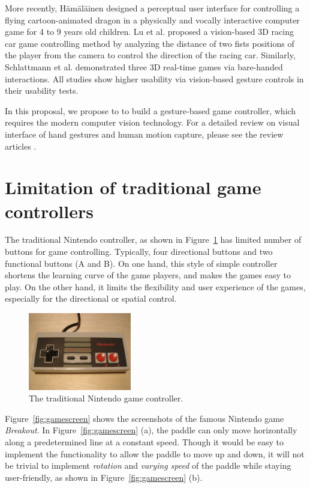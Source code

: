 \documentclass[10pt,twocolumn,letterpaper]{article}
\begin{document}
More recently, H\"{a}m\"{a}l\"{a}inen \cite{childgame} designed a perceptual user interface for
controlling a flying cartoon-animated dragon in a
physically and vocally interactive computer game for 4 to 9 years old children.
Lu et al. \cite{racecar} proposed a vision-based 3D racing car game controlling
method by analyzing the distance of two fists positions of the player
from the camera to control the direction of the racing car. Similarly, 
Schlattmann \cite{3dgames} et al. demonstrated three 3D real-time games via bare-handed 
interactions. All studies show higher usability via vision-based gesture controls 
in their usability tests.


In this proposal, we propose to to build a gesture-based game controller, which 
requires the modern computer vision technology. For a detailed review on visual 
interface of hand gestures and human motion capture, please see 
the review articles \cite{pamireview, cviureview}.

\section{Limitation of traditional game controllers}
The traditional Nintendo controller, as shown in Figure~\ref{fig:oldgamestick} 
has limited number of buttons for game controlling. Typically, 
four directional buttons and two functional buttons (A and B). 
On one hand, this style of simple controller shortens the learning 
curve of the game players, and makes the games easy to play. On the other hand, 
it limits the flexibility and user experience of the games, 
especially for the directional or spatial control.

\begin{figure}[h]
\centering
\includegraphics[width=4.5cm]{pics/nintendo.png}
\caption{The traditional Nintendo game controller.}
\label{fig:oldgamestick}
\end{figure}

Figure~\ref{fig:gamescreen} shows the 
screenshots of the famous 
Nintendo game \emph{Breakout}. In Figure~\ref{fig:gamescreen} (a), 
the paddle can only move horizontally along a predetermined line at a 
constant speed. Though it would be easy to implement the 
functionality to allow the paddle to move up and down, it 
will not be trivial to implement \emph{rotation} and \emph{varying speed} 
of the paddle while staying user-friendly, as shown 
in Figure~\ref{fig:gamescreen} (b).
\end{document}
